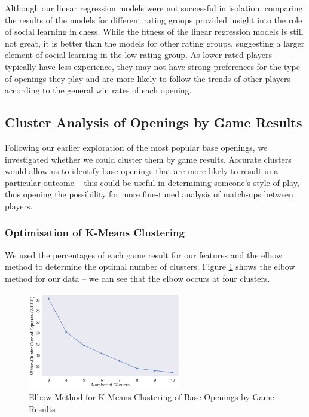 \documentclass[a4paper, 11pt]{article}
\begin{document}
\begin{figure}[H]
\begin{subfigure}{0.49\textwidth}
    \end{subfigure}
\end{figure}

Although our linear regression models were not successful in isolation, comparing the results of the models for different rating groups provided insight into the role of social learning in chess. While the fitness of the linear regression models is still not great, it is better than the models for other rating groups, suggesting a larger element of social learning in the low rating group. As lower rated players typically have less experience, they may not have strong preferences for the type of openings they play and are more likely to follow the trends of other players according to the general win rates of each opening.

\subsection{Cluster Analysis of Openings by Game Results}
Following our earlier exploration of the most popular base openings, we investigated whether we could cluster them by game results. Accurate clusters would allow us to identify base openings that are more likely to result in a particular outcome -- this could be useful in determining someone's style of play, thus opening the possibility for more fine-tuned analysis of match-ups between players.

\subsubsection{Optimisation of K-Means Clustering}
We used the percentages of each game result for our features and the elbow method to determine the optimal number of clusters. Figure \ref{fig:elbowMethodForBaseOpeningsClusteredByGameResults} shows the elbow method for our data -- we can see that the elbow occurs at four clusters.

\begin{figure}[H]
    \centering
    \caption{Elbow Method for K-Means Clustering of Base Openings by Game Results}
    \label{fig:elbowMethodForBaseOpeningsClusteredByGameResults}
    \includegraphics[width=0.6\textwidth]{Elbow Method for Clustering of Base Opening by Results.png}
\end{figure}
\end{document}
